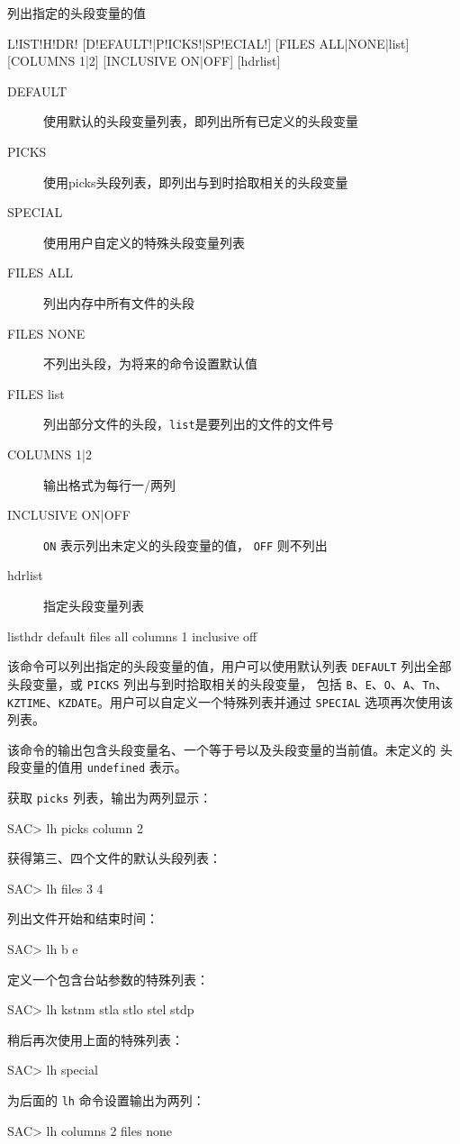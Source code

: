 \label{cmd:listhdr}

列出指定的头段变量的值

\begin{SACSTX}
L!IST!H!DR! [D!EFAULT!|P!ICKS!|SP!ECIAL!] [FILES ALL|NONE|list] [COLUMNS 1|2]
    [INCLUSIVE ON|OFF] [hdrlist]
\end{SACSTX}

\begin{description}
\item [DEFAULT] 使用默认的头段变量列表，即列出所有已定义的头段变量
\item [PICKS] 使用picks头段列表，即列出与到时拾取相关的头段变量
\item [SPECIAL] 使用用户自定义的特殊头段变量列表
\item [FILES ALL] 列出内存中所有文件的头段
\item [FILES NONE] 不列出头段，为将来的命令设置默认值
\item [FILES list] 列出部分文件的头段，\texttt{list}是要列出的文件的文件号
\item [COLUMNS 1|2] 输出格式为每行一/两列
\item [INCLUSIVE ON|OFF] \texttt{ON} 表示列出未定义的头段变量的值，
    \texttt{OFF} 则不列出
\item [hdrlist] 指定头段变量列表
\end{description}

\begin{SACDFT}
listhdr default files all columns 1 inclusive off
\end{SACDFT}

该命令可以列出指定的头段变量的值，用户可以使用默认列表 \texttt{DEFAULT}
列出全部头段变量，或 \texttt{PICKS} 列出与到时拾取相关的头段变量，
包括 \texttt{B}、\texttt{E}、\texttt{O}、\texttt{A}、\texttt{Tn}、
\texttt{KZTIME}、\texttt{KZDATE}。用户可以自定义一个特殊列表并通过
\texttt{SPECIAL} 选项再次使用该列表。

该命令的输出包含头段变量名、一个等于号以及头段变量的当前值。未定义的
头段变量的值用 \texttt{undefined} 表示。

获取 \texttt{picks} 列表，输出为两列显示：
\begin{SACCode}
SAC> lh picks column 2
\end{SACCode}

获得第三、四个文件的默认头段列表：
\begin{SACCode}
SAC> lh files 3 4
\end{SACCode}

列出文件开始和结束时间：
\begin{SACCode}
SAC> lh b e
\end{SACCode}

定义一个包含台站参数的特殊列表：
\begin{SACCode}
SAC> lh kstnm stla stlo stel stdp
\end{SACCode}

稍后再次使用上面的特殊列表：
\begin{SACCode}
SAC> lh special
\end{SACCode}

为后面的 \texttt{lh} 命令设置输出为两列：
\begin{SACCode}
SAC> lh columns 2 files none
\end{SACCode}
